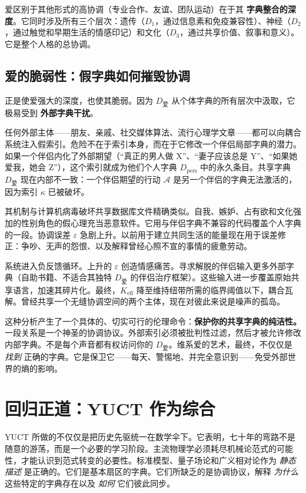 \documentclass[12pt,a4paper]{article}
\begin{document}
	爱区别于其他形式的高协调（专业合作、友谊、团队运动）在于其 \textbf{字典整合的深度}。它同时涉及所有三个层次：遗传（\(D_1\)，通过信息素和免疫兼容性）、神经（\(D_2\)，通过触觉和早期生活的情感印记）和文化（\(D_3\)，通过共享价值、叙事和意义）。它是整个人格的总协调。
	
	\subsection{爱的脆弱性：假字典如何摧毁协调}
	
	正是使爱强大的深度，也使其脆弱。因为 \(D_{\text{爱}}\) 从个体字典的所有层次中汲取，它极易受到 \textbf{外部字典干扰}。
	
	任何外部主体——朋友、亲戚、社交媒体算法、流行心理学文章——都可以向耦合系统注入假索引。危险不在于索引本身，而在于它修改一个伴侣局部字典的潜力。如果一个伴侣内化了外部期望（“真正的男人做 X”、“妻子应该总是 Y”、“如果她爱我，她会 Z”），这个索引就成为他们个人字典 \(D_{\text{pers}}\) 中的永久条目。共享字典 \(D_{\text{爱}}\) 现在内部不一致：一个伴侣期望的行动 \(\mathcal{A}\) 是另一个伴侣的字典无法激活的，因为索引 \(\kappa\) 已被破坏。
	
	其机制与计算机病毒破坏共享数据库文件精确类似。自我、嫉妒、占有欲和文化强加的性别角色的假心理充当恶意软件。它用与伴侣字典不兼容的代码覆盖个人字典的一段。协调误差 \(\varepsilon\) 急剧上升。以前用于建立共同生活的能量现在用于误差修正：争吵、无声的怨恨、以及解释曾经心照不宣的事情的疲惫劳动。
	
	系统进入负反馈循环。上升的 \(\varepsilon\) 创造情感痛苦。寻求解脱的伴侣输入更多外部字典（自助书籍、不适合其独特 \(D_{\text{爱}}\) 的伴侣治疗框架）。这些输入进一步覆盖原始共享语言，加速其碎片化。最终，\(K_{\mathrm{eff}}\) 降至维持纽带所需的临界阈值以下，耦合瓦解。曾经共享一个无缝协调空间的两个主体，现在对彼此来说是噪声的孤岛。
	
	这种分析产生了一个具体的、切实可行的伦理命令：\textbf{保护你的共享字典的纯洁性。} 一段关系是一个神圣的协调协议。外部索引必须被批判性过滤，然后才被允许修改内部字典。不是每个声音都有权访问你的 \(D_{\text{爱}}\)。维系爱的艺术，最终，不仅仅是 \emph{找到} 正确的字典。它是保卫它——每天、警惕地、并完全意识到——免受外部世界的熵的影响。
	
	\section{回归正道：YUCT 作为综合}
	
	YUCT 所做的不仅仅是把历史先驱统一在数学伞下。它表明，七十年的弯路不是随意的游荡，而是一个必要的学习阶段。主流物理学必须耗尽机械论范式的可能性，才能认识到范式转变的必要性。标准模型、量子场论和广义相对论作为 \emph{静态描述} 是正确的。它们是基本扇区的字典。它们所缺乏的是协调协议，解释 \emph{为什么} 这些特定的字典存在以及 \emph{如何} 它们彼此同步。
	
\end{document}
